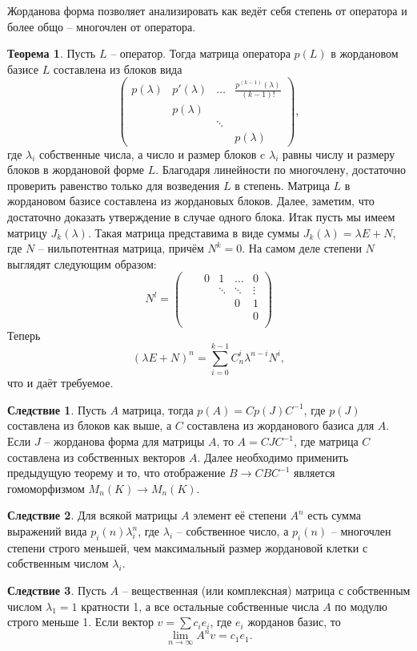 \documentclass[10pt,a4paper,oneside]{book}
\theoremstyle{definition}
\newtheorem{thm}{Теорема}
\newtheorem{cor}{Следствие}
\def\thrm{\begin{thm}}
\def\ethrm{\end{thm}}
\def\crl{\begin{cor}}
\def\ecrl{\end{cor}}
\def\pmat{\begin{pmatrix}}
\def\epmat{\end{pmatrix}}
\begin{document}
Жорданова форма позволяет анализировать как ведёт себя степень от оператора и более общо -- многочлен от оператора.

\thrm
Пусть $L$ -- оператор. Тогда матрица оператора $p(L)$ в жордановом базисе $L$ составлена из блоков вида
$$ \pmat p(\lambda) & p'(\lambda) & \dots & \frac{p^{(k-1)}(\lambda)}{(k-1)!}\\
 &  p(\lambda) & &\\
 &            & \ddots & \\
 &&&  p(\lambda) \epmat,$$
где $\lambda_i$ собственные числа, а число и размер блоков c $\lambda_i$ равны числу и размеру блоков в жордановой форме $L$.
\proof Благодаря линейности по многочлену, достаточно проверить равенство только для возведения $L$ в степень. Матрица $L$ в жордановом базисе составлена из жордановых блоков. Далее, заметим, что достаточно доказать утверждение в случае одного блока. Итак пусть мы имеем матрицу $J_k(\lambda)$. Такая матрица представима в виде суммы $J_k(\lambda)= \lambda E + N$, где $N$ -- нильпотентная матрица, причём $N^k=0$. На самом деле степени $N$ выглядят следующим образом:
$$N^l= \pmat  & &0& 1& \dots &0 \\
   & && \ddots &\ddots& \vdots\\
 &&&&0& 1\\
 &&&&& 0 \\
 &&&&&  \epmat $$
Теперь
$$(\lambda E+N)^n= \sum_{i=0}^{k-1} C_n^i\lambda^{n-i}N^i,$$
что и даёт требуемое.
\endproof
\ethrm

\crl Пусть $A$ матрица, тогда $p(A)=C p(J) C^{-1}$, где $p(J)$ составлена из блоков как выше, а $C$ составлена из жорданового базиса для $A$.
\proof Если $J$ -- жорданова форма для матрицы $A$, то $A=CJC^{-1}$, где матрица $C$ составлена из собственных векторов $A$. Далее необходимо применить предыдущую теорему и то, что отображение $B \to CBC^{-1}$ является гомоморфизмом $M_n(K) \to M_n(K)$.
\endproof
\ecrl

\crl Для всякой матрицы $A$ элемент её степени $A^n$ есть сумма выражений вида $p_i(n)\lambda_i^n$, где $\lambda_i$ -- собственное число, а $p_i(n)$ -- многочлен степени строго меньшей, чем максимальный размер жордановой клетки с собственным числом $\lambda_i$.
\ecrl

\crl Пусть $A$ -- вещественная (или комплексная) матрица с собственным числом $\lambda_1=1$ кратности 1, а все остальные собственные числа $A$ по модулю строго меньше 1. Если вектор $v= \sum c_i e_i$, где $e_i$ жорданов базис, то $$\lim_{n \to \infty}A^nv= c_1 e_1.$$
\ecrl
\end{document}

